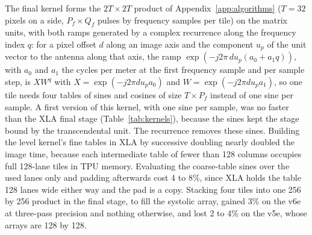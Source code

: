 \documentclass[11pt]{article}
\begin{document}
The final kernel forms the $2T \times 2T$ product of Appendix~\ref{app:algorithms} ($T = 32$ pixels on a side, $P_f \times Q_f$ pulses by frequency samples per tile) on the matrix units, with both ramps generated by a complex recurrence along the frequency index $q$: for a pixel offset $d$ along an image axis and the component $u_p$ of the unit vector to the antenna along that axis, the ramp $\exp(-j 2\pi\, d u_p (a_0 + a_1 q))$, with $a_0$ and $a_1$ the cycles per meter at the first frequency sample and per sample step, is $X W^q$ with $X = \exp(-j 2\pi d u_p a_0)$ and $W = \exp(-j 2\pi d u_p a_1)$, so one tile needs four tables of sines and cosines of size $T \times P_f$ instead of one sine per sample. A first version of this kernel, with one sine per sample, was no faster than the XLA final stage (Table~\ref{tab:kernels}), because the sines kept the stage bound by the transcendental unit. The recurrence removes these sines. Building the level kernel's fine tables in XLA by successive doubling nearly doubled the image time, because each intermediate table of fewer than 128 columns occupies full 128-lane tiles in TPU memory. Evaluating the coarse-table sines over the used lanes only and padding afterwards cost 4 to 8\%, since XLA holds the table 128 lanes wide either way and the pad is a copy. Stacking four tiles into one 256 by 256 product in the final stage, to fill the systolic array, gained 3\% on the v6e at three-pass precision and nothing otherwise, and lost 2 to 4\% on the v5e, whose arrays are 128 by 128. 
\end{document}
